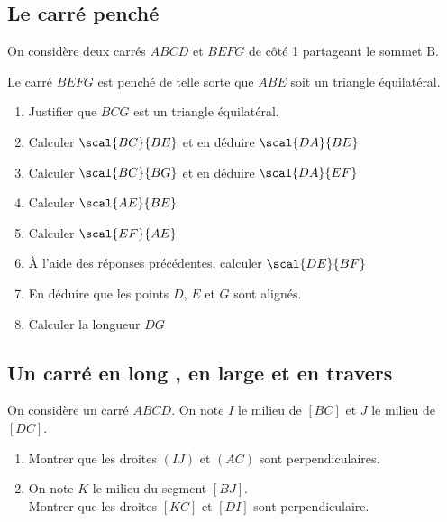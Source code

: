 \documentclass[oneside,12pt]{book}          %
\begin{document}
\subsection{Le carré penché}

    On considère deux carrés $ABCD$ et $BEFG$ de côté 1 partageant le sommet B.

    Le carré $BEFG$ est penché de telle sorte que $ABE$ soit un triangle équilatéral.
    
\begin{minipage}{0.5\linewidth}
\begin{enumerate}
    \item Justifier que $BCG$ est un triangle équilatéral.
    \item Calculer $\scal{BC}{BE}$ et en déduire $\scal{DA}{BE}$
    \item Calculer $\scal{BC}{BG}$ et en déduire $\scal{DA}{EF}$
    \item Calculer $\scal{AE}{BE}$
    \item Calculer $\scal{EF}{AE}$
    \item À l'aide des réponses précédentes, calculer $\scal{DE}{BF}$
    \item En déduire que les points $D$, $E$ et $G$ sont alignés.
    \item[$\dur$] Calculer la longueur $DG$
\end{enumerate}
\end{minipage}
\hfill
\begin{minipage}{0.4\linewidth}
\end{minipage}



\subsection{Un carré en long , en large et en travers}

On considère un carré $ABCD$. On note $I$ le milieu de $[BC]$ et $J$ le milieu de $[DC]$.
\begin{enumerate}
    \item Montrer que les droites $(IJ)$ et $(AC)$ sont perpendiculaires.
    \item On note $K$ le milieu du segment $[BJ]$. \\
    Montrer que les droites $[KC]$ et $[DI]$ sont perpendiculaire.
\end{enumerate}
\end{document}
